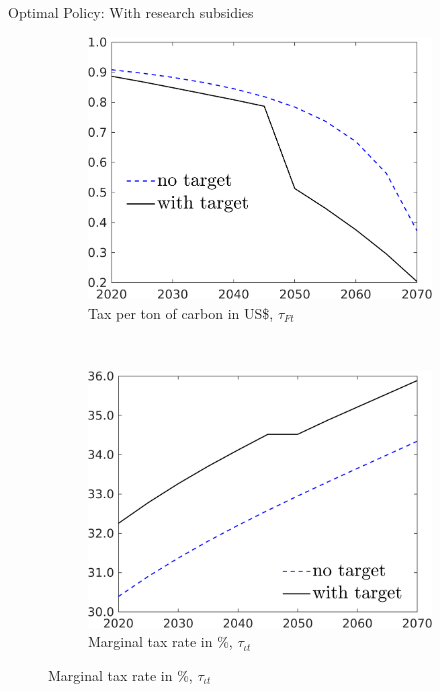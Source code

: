 \documentclass[11pt,aspectratio=169]{beamer}
\begin{document}
\begin{frame}{Optimal Policy: With research subsidies}
\vspace{-3mm}
\begin{figure}[h!!]
	
	\begin{subfigure}{0.45\textwidth}		
		\caption{Tax per ton of carbon in US\$, $\tau_{Ft}$}
		\includegraphics[width=1\textwidth]{../codding_model/own_basedOnFried/optimalPol_010922_revision/figures/all_13Sept22/NewCalib_pol_TvsNoT_taus_RS_emnet1_Sun2_spillover0_knspil3_xgr0_nsk0_sep0_extern0_PV1_etaa0.79_lgd1.png}
	\end{subfigure}	
	\begin{minipage}[]{0.05\textwidth}
		\ 
	\end{minipage}
	\begin{subfigure}{0.45\textwidth}		
		\caption{Marginal tax rate in \%, $\tau_{\iota t}$}
		\includegraphics[width=1\textwidth]{../codding_model/own_basedOnFried/optimalPol_010922_revision/figures/all_13Sept22/NewCalib_pol_TvsNoT_dTaulAvS_RS_emnet1_Sun2_spillover0_knspil3_xgr0_nsk0_sep0_extern0_PV1_etaa0.79_lgd1.png}
	\end{subfigure}
\end{figure}



\end{frame}
\end{document}
